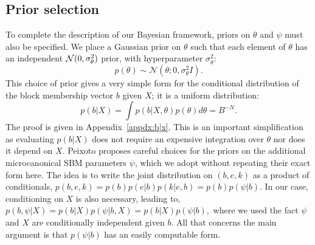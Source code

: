 \subsection{Prior selection}

To complete the description of our Bayesian framework,
priors on $\theta$ and $\psi$ must also be specified. 
We place a Gaussian prior on $\theta$ such that
each element of $\theta$ has an independent ${\cal N}(0,\sigma_\theta^2)$
prior, with hyperparameter $\sigma_\theta^2$:
%
\begin{equation}
	p(\theta) \sim \mathcal{N} \left( \theta ; 0, \sigma_\theta^2 I \right).
	\label{eqn:theta-prior}
\end{equation}
%
This choice of prior gives a very
simple form for the conditional distribution of the block membership vector $b$ given $X$; it is a uniform distribution:
%
\begin{equation}
	p(b | X) = \int p(b | X, \theta) p(\theta) d\theta = B^{-N}.
	\label{eqn:b-pseudo-prior}
\end{equation}
%
The proof is given in Appendix~\ref{appdx:b|x}. This is an important simplification as evaluating $p(b | X)$ does not require an expensive  integration over $\theta$ nor does it depend on $X$.
Peixoto \cite{Peixoto-Bayesian-Microcanonical} proposes careful choices for 
the priors on the additional microcanonical SBM parameters $\psi$, which we adopt without repeating their exact form here. 
The idea is to write the joint distribution on $(b, e, k)$ as a product of 
conditionals, $p(b, e, k) = p(b) p(e | b) p(k | e, b)= p(b) p(\psi | b)$. 
In our case, conditioning on $X$ is also necessary, leading to,
$
p(b, \psi | X) = p(b | X) p(\psi | b, X) = p(b | X) p(\psi | b),
$
where we used the fact $\psi$ and $X$ are conditionally 
independent given $b$.
All that concerns the main argument is that $p(\psi|b)$ has
an easily computable form.